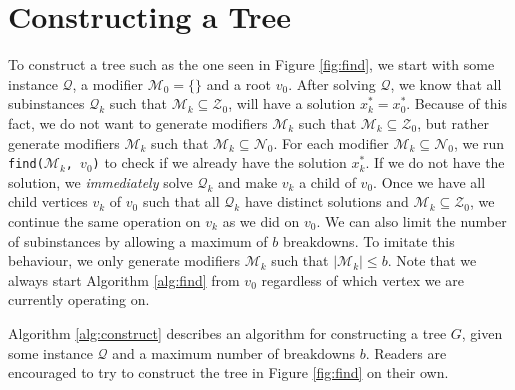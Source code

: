 \section{Constructing a Tree}
\label{sec:construction}
To construct a tree such as the one seen in Figure \ref{fig:find}, we start
with some instance $\mathcal{Q}$, a modifier $\mathcal{M}_0 = \{ {} \}$ and
a root $v_0$. After solving $\mathcal{Q}$, we know that all subinstances
$\mathcal{Q}_k$ such that $\mathcal{M}_k \subseteq \mathcal{Z}_0$, will have
a solution $x_k^* = x_0^*$. Because of this fact, we do not want to generate
modifiers $\mathcal{M}_k$ such that $\mathcal{M}_k \subseteq \mathcal{Z}_0$,
but rather generate modifiers $\mathcal{M}_k$ such that $\mathcal{M}_k
\subseteq \mathcal{N}_0$.
For each modifier $\mathcal{M}_k \subseteq \mathcal{N}_0$, we run
\texttt{find($\mathcal{M}_k$, $v_0$)} to check if we already have the solution
$x_k^*$.
If we do not have the solution, we \emph{immediately} solve $\mathcal{Q}_k$
and make $v_k$ a child of $v_0$. Once we have all child vertices $v_k$ of $v_0$
such that all $\mathcal{Q}_k$ have distinct solutions and $\mathcal{M}_k
\subseteq \mathcal{Z}_0$, we continue the same operation on $v_k$ as we did
on $v_0$.
We can also limit the number of subinstances by allowing a maximum of $b$
breakdowns.
To imitate this behaviour, we only generate modifiers $\mathcal{M}_k$ such that
$|\mathcal{M}_k| \leq b$.
Note that we always start Algorithm \ref{alg:find} from $v_0$
regardless of which vertex we are currently operating on.


Algorithm \ref{alg:construct} describes an algorithm for constructing a tree
$G$, given some instance $\mathcal{Q}$ and a maximum number of breakdowns $b$.
Readers are encouraged to try to construct the tree in Figure \ref{fig:find} on
their own.
